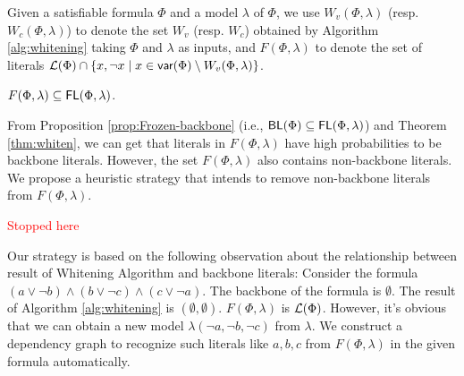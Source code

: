 Given a satisfiable formula $\Phi$ and a model $\lambda$ of $\Phi$, we use $W_v(\Phi,\lambda)$ (resp. $W_c(\Phi,\lambda)$) to denote the set
$W_v$ (resp. $W_c$) obtained by Algorithm \ref{alg:whitening} taking $\Phi$ and $\lambda$ as inputs, and
$F(\Phi,\lambda)$ to denote the set of literals ${\cal L}(\Phi)\cap \{x,\neg x\mid x\in \textsf{var}(\Phi)\setminus W_v(\Phi,\lambda)\}$.



\begin{theorem}\cite{LMZ09}
\label{thm:whiten}
$F(\Phi,\lambda)\subseteq\textsf{FL}(\Phi,\lambda)$.
\end{theorem}

From Proposition \ref{prop:Frozen-backbone} (i.e., $\textsf{BL}(\Phi)\subseteq\textsf{FL}(\Phi,\lambda)$) and Theorem \ref{thm:whiten},
we can get that literals in $F(\Phi,\lambda)$ have high probabilities to be backbone literals. However, the set $F(\Phi,\lambda)$ also contains non-backbone literals. We propose a heuristic strategy that intends to remove non-backbone literals from $F(\Phi,\lambda)$.

\textcolor{red}{Stopped here}
 
 Our strategy is based on the following observation about the relationship between result of Whitening Algorithm and backbone literals:
 Consider the formula $(a\vee\neg b)\wedge(b\vee\neg c)\wedge(c\vee\neg a)$. The backbone of the formula is $\emptyset$. The result of Algorithm \ref{alg:whitening} is $(\emptyset, \emptyset)$. $F(\Phi,\lambda)$ is ${\cal L}(\Phi)$. However, it's obvious that we can obtain a new model $\lambda(\neg a, \neg b, \neg c)$ from $\lambda$. We construct a dependency graph to recognize such literals like $a,b,c$ from $F(\Phi, \lambda)$ in the given formula automatically.
 
